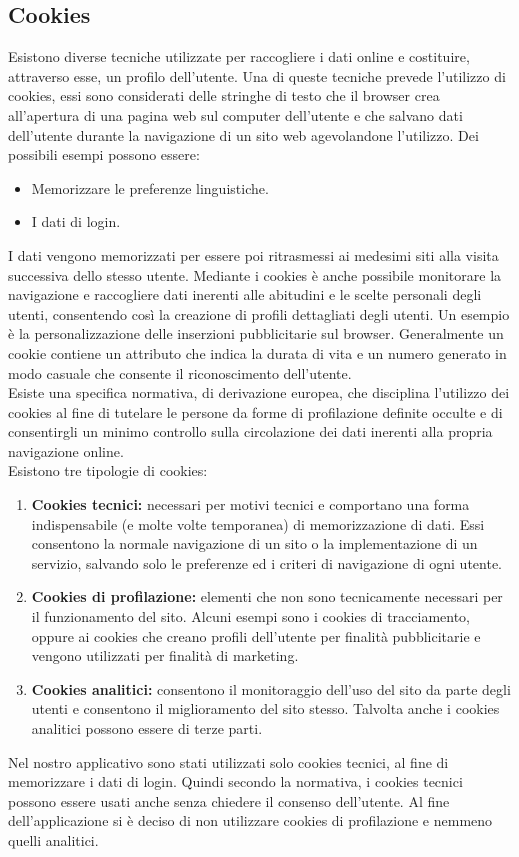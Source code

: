 \documentclass[a4paper,final,12pt]{report}
\begin{document}
\subsection{Cookies}
Esistono diverse tecniche utilizzate per raccogliere i dati online e costituire, attraverso esse, un profilo dell'utente. Una di queste tecniche prevede l'utilizzo di cookies, essi sono considerati delle stringhe di testo che il browser crea all'apertura di una pagina web sul computer dell'utente e che salvano dati dell'utente durante la navigazione di un sito web agevolandone l'utilizzo. Dei possibili esempi possono essere:
\begin{itemize}
\item Memorizzare le preferenze linguistiche.
\item I dati di login.
\end{itemize}
I dati vengono memorizzati per essere poi ritrasmessi ai medesimi siti alla visita successiva dello stesso utente. Mediante i cookies è anche possibile monitorare la navigazione e raccogliere dati inerenti alle abitudini e le scelte personali degli utenti, consentendo così la creazione di profili dettagliati degli utenti. Un esempio è la personalizzazione delle inserzioni pubblicitarie sul browser. Generalmente un cookie contiene un attributo che indica la durata di vita e un numero generato in modo casuale che consente il riconoscimento dell'utente.\\
Esiste una specifica normativa, di derivazione europea, che disciplina l'utilizzo dei cookies al fine di tutelare le persone da forme di profilazione definite occulte e di consentirgli
un minimo controllo sulla circolazione dei dati inerenti alla propria navigazione online.\\
Esistono tre tipologie di cookies:
\begin{enumerate}
\item \textbf{Cookies tecnici:} necessari per motivi tecnici e comportano una forma indispensabile (e molte volte temporanea) di memorizzazione di dati. Essi consentono la normale navigazione di un sito o la implementazione di un servizio, salvando solo le preferenze ed i criteri di navigazione di ogni utente.
\item \textbf{Cookies di profilazione:} elementi che non sono tecnicamente necessari per il funzionamento del sito. Alcuni esempi sono i cookies di tracciamento, oppure ai cookies che creano profili dell'utente per finalità pubblicitarie e vengono utilizzati per finalità di marketing.
\item \textbf{Cookies analitici:} consentono il monitoraggio dell'uso del sito da parte degli utenti e consentono il miglioramento del sito stesso. Talvolta anche i cookies analitici possono essere di terze parti.
\end{enumerate}
Nel nostro applicativo sono stati utilizzati solo cookies tecnici, al fine di memorizzare i dati di login. Quindi secondo la normativa, i cookies tecnici possono essere usati anche senza chiedere il consenso dell'utente. Al fine dell'applicazione si è deciso di non utilizzare cookies di profilazione e nemmeno quelli analitici.
\end{document}
